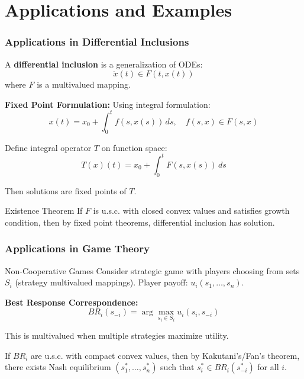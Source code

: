 \documentclass[aspectratio=169,10pt]{beamer}
\begin{document}
\section{Applications and Examples}

\begin{frame}
\frametitle{Applications in Differential Inclusions}

\begin{definition}
A \textbf{differential inclusion} is a generalization of ODEs:
\[
\dot{x}(t) \in F(t, x(t))
\]
where $F$ is a multivalued mapping.
\end{definition}

\vspace{0.3cm}

\textbf{Fixed Point Formulation:}
Using integral formulation:
\[
x(t) = x_0 + \int_0^t f(s, x(s)) \, ds, \quad f(s, x) \in F(s, x)
\]

Define integral operator $T$ on function space:
\[
T(x)(t) = x_0 + \int_0^t F(s, x(s)) \, ds
\]

Then solutions are fixed points of $T$.

\vspace{0.3cm}

\begin{block}{Existence Theorem}
If $F$ is u.s.c. with closed convex values and satisfies growth condition,
then by fixed point theorems, differential inclusion has solution.
\end{block}

\end{frame}

\begin{frame}
\frametitle{Applications in Game Theory}

\begin{block}{Non-Cooperative Games}
Consider strategic game with players choosing from sets $S_i$ (strategy multivalued mappings).
Player payoff: $u_i(s_1, \ldots, s_n)$.
\end{block}

\vspace{0.3cm}

\textbf{Best Response Correspondence:}
\[
BR_i(s_{-i}) = \arg\max_{s_i \in S_i} u_i(s_i, s_{-i})
\]

This is multivalued when multiple strategies maximize utility.

\vspace{0.3cm}

\begin{theorem}
If $BR_i$ are u.s.c. with compact convex values, then by Kakutani's/Fan's theorem,
there exists Nash equilibrium $(s_1^*, \ldots, s_n^*)$ such that
$s_i^* \in BR_i(s_{-i}^*)$ for all $i$.
\end{theorem}

\end{frame}
\end{document}
